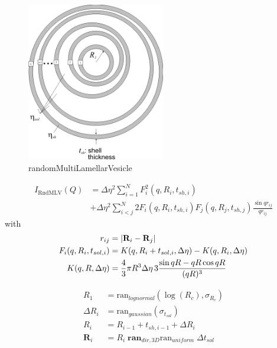 \begin{figure}[htb]
\begin{center}
\includegraphics[width=0.537\textwidth]{../images/form_factor/spheres/random_multilamellar_vesicle.png}
\end{center}
\caption{randomMultiLamellarVesicle}
\label{fig:randomMultiLamellarVesicle}
\end{figure}
\begin{align}
I_\text{RndMLV}(Q) &= \Delta\eta ^2 \sum_{i=1}^{N} F_i^2(q,R_i,t_{sh,i}) \nonumber \\
&+ \Delta\eta ^2 \sum_{i<j}^{N} 2 F_i(q,R_i,t_{sh,i}) F_j(q,R_j,t_{sh,j}) \frac{\sin qr_{ij}}{qr_{ij}}
\end{align}
with
\begin{subequations}
\begin{align}
r_{ij} & = \abs{\mathbf{R}_i-\mathbf{R}_j} \\
F_i(q,R_i,t_{sol,i}) &= K(q,R_i+t_{sol,i},\Delta\eta)-K(q,R_i,\Delta\eta)\\
K(q,R,\Delta\eta) &= \frac{4}{3}\pi R^3 \Delta\eta \, 3 \frac{\sin qR - qR \cos qR}{(qR)^3}
\end{align}
\end{subequations}

\begin{subequations}
\begin{align}
R_1 &= \textrm{ran}_{lognormal}\left(\log(R_c),\sigma_{R_c}\right) \\
\Delta R_{i} &= \textrm{ran}_{gaussian}\left(\sigma_{t_{sol}}\right) \\
R_i &= R_{i-1}+t_{sh,i-1}+\Delta R_{i}\\
\mathbf{R}_i &= R_i \; \textbf{ran}_{dir,3D}
                       \text{ran}_{uniform} \; \Delta t_{sol}
\end{align}
\end{subequations}



